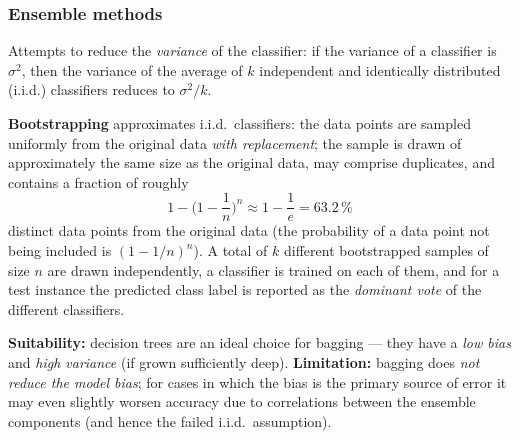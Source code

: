 \documentclass[11pt,a4paper]{article}
\theoremstyle{definition}
\begin{document}
\subsubsection{Ensemble methods}

\begin{defbox}
Attempts to reduce the \emph{variance} of the classifier: if the variance of a classifier is
$\sigma^2$, then the variance of the average of $k$ independent and identically distributed
(i.i.d.) classifiers reduces to $\sigma^2/k$.

\textbf{Bootstrapping} approximates i.i.d.\ classifiers: the data points are sampled uniformly
from the original data \emph{with replacement}; the sample is drawn of approximately the same size
as the original data, may comprise duplicates, and contains a fraction of roughly
\[ 1-\Big(1-\frac1n\Big)^{\!n}\approx 1-\frac1e=63.2\,\% \]
distinct data points from the original data (the probability of a data point not being included is
$(1-1/n)^n$). A total of $k$ different bootstrapped samples of size $n$ are drawn independently, a
classifier is trained on each of them, and for a test instance the predicted class label is
reported as the \emph{dominant vote} of the different classifiers.

\textbf{Suitability:} decision trees are an ideal choice for bagging --- they have a \emph{low
bias} and \emph{high variance} (if grown sufficiently deep).
\textbf{Limitation:} bagging does \emph{not reduce the model bias}; for cases in which the bias is
the primary source of error it may even slightly worsen accuracy due to correlations between the
ensemble components (and hence the failed i.i.d.\ assumption).
\end{defbox}
\end{document}
